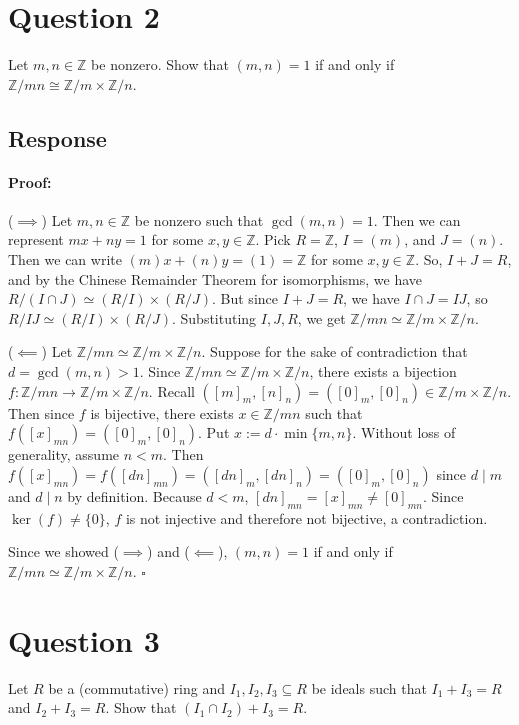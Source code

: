 \documentclass [12pt] {article}
\newcommand{\Z}{\mathbb{Z}}
\newenvironment{proof}{\paragraph{Proof:}}{\hfill$\square$}
\begin{document}
\newpage
\section*{Question 2}
Let $m,n\in\Z$ be nonzero. Show that $(m,n)=1$ if and only if $\Z/mn\cong \Z/m \times \Z/n$.

\subsection*{Response}
\begin{proof}
($\implies$) Let $m, n \in \Z$ be nonzero such that $\gcd(m, n) = 1$. 
Then we can represent $mx + ny = 1$ for some $x, y \in \Z$.
Pick $R = \Z$, $I = (m)$, and $J = (n)$. Then we can write $(m)x + (n)y = (1) = \Z$ for some $x, y \in \Z$.
So, $I + J = R$, and by the Chinese Remainder Theorem
for isomorphisms, we have
$R/(I \cap J) \simeq (R/I) \times (R/J)$. But since $I + J = R$, we have $I \cap J = IJ$, so
$R/IJ \simeq (R/I) \times (R/J)$. Substituting $I, J, R$, we get
$\Z/mn \simeq \Z/m \times \Z/n$.
\vspace{0.5em}

($\impliedby$) Let $\Z/mn \simeq \Z/m \times \Z/n$. Suppose for the sake of
contradiction that $d = \gcd(m, n) > 1$. Since $\Z/mn \simeq \Z/m \times \Z/n$, there exists a
bijection $f : \Z/mn \to \Z/m \times \Z/n$. Recall 
$([m]_m, [n]_n) = ([0]_m, [0]_n) \in \Z/m \times \Z/n$. Then since $f$ is bijective, there exists 
$x \in \Z/mn$ such that $f([x]_{mn}) = ([0]_m, [0]_n)$. Put $x := d \cdot \min\{ m, n \}$. 
Without loss of generality, assume $n < m$. Then 
$f([x]_{mn}) = f([dn]_{mn}) = ([dn]_m, [dn]_n) = ([0]_m, [0]_n)$ since $d \mid m$ and $d \mid n$ by 
definition. Because $d < m$, $[dn]_{mn} = [x]_{mn} \neq [0]_{mn}$. Since
$\ker(f) \neq \{ 0 \}$, $f$ is not injective and therefore not bijective, a contradiction.
\vspace{1em}

Since we showed ($\implies$) and ($\impliedby$), $(m,n)=1$ if and only if $\Z/mn\simeq \Z/m \times \Z/n$.
\end{proof}
 



\newpage
\section*{Question 3}
Let $R$ be a (commutative) ring and  $I_1,I_2,I_3\subseteq R$ be ideals such that $I_1+I_3=R$ and
$I_2+I_3=R$. Show that $(I_1\cap I_2)+I_3=R$. 
\end{document}
